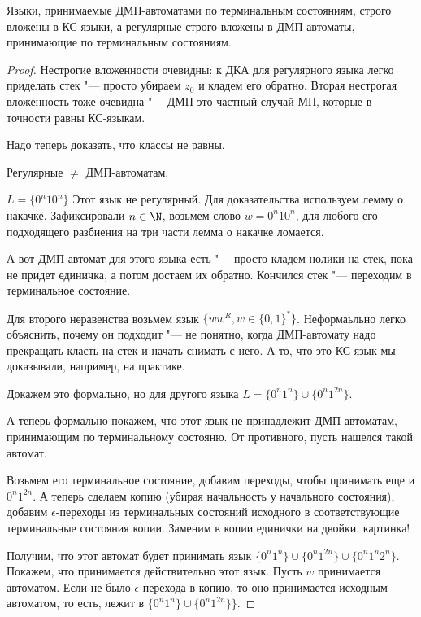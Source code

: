 \begin{theorem}
Языки, принимаемые ДМП-автоматами по терминальным состояниям, строго вложены в КС-языки, а регулярные строго вложены в ДМП-автоматы, принимающие по терминальным состояниям.
\end{theorem}
\begin{proof}
Нестрогие вложенности очевидны: к ДКА для регулярного языка легко приделать стек "--- просто убираем $z_0$ и кладем его обратно.
Вторая нестрогая вложенность тоже очевидна "--- ДМП это частный случай МП, которые в точности равны КС-языкам.

Надо теперь доказать, что классы не равны.

Регулярные $\neq$ ДМП-автоматам.

$L = \{0^n10^n\}$
Этот язык не регулярный. Для доказательства используем лемму о накачке. Зафиксировали $n \in \N$, возьмем слово $w = 0^n10^n$, для любого его подходящего разбиения на три части лемма о накачке ломается.

А вот ДМП-автомат для этого языка есть "--- просто кладем нолики на стек, пока не придет единичка, а потом достаем их обратно. 
Кончился стек "--- переходим в терминальное состояние.

Для второго неравенства возьмем язык $\{ww^R, w \in \{0, 1\}^*\}$.
Неформаьльно легко объяснить, почему он подходит "--- не понятно, когда ДМП-автомату надо прекращать класть на стек и начать снимать с него. 
А то, что это КС-язык мы доказывали, например, на практике.

Докажем это формально, но для другого языка $L = \{0^n1^n\} \cup \{0^n 1^{2n}\}$.

А теперь формально покажем, что этот язык не принадлежит ДМП-автоматам, принимающим по терминальному состояню.
От противного, пусть нашелся такой автомат.

Возьмем его терминальное состояние, добавим переходы, чтобы принимать еще и $0^n 1^{2n}$.
А теперь сделаем копию (убирая начальность у начального состояния), добавим $\epsilon$-переходы из терминальных состояний исходного в соответствующие терминальные состояния копии.
Заменим в копии единички на двойки. 
\TODO картинка!

Получим, что этот автомат будет принимать язык $\{0^n1^n\} \cup \{0^n1^{2n}\} \cup \{0^n1^n2^n\}$. 
Покажем, что принимается действительно этот язык.
Пусть $w$ принимается автоматом. Если не было $\epsilon$-перехода в копию, то оно принимается исходным автоматом, то есть, лежит в $\{0^n1^n\} \cup \{0^n1^{2n}\}\}$.


\end{proof}
